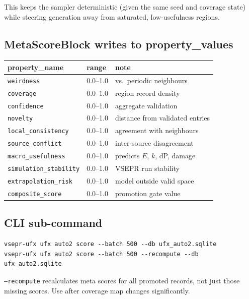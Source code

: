 \documentclass[11pt, a4paper]{article}
\begin{document}
This keeps the sampler deterministic (given the same seed and coverage state)
while steering generation away from saturated, low-usefulness regions.

\subsection{MetaScoreBlock writes to property\_values}

\begin{center}
\begin{tabular}{lll}
\toprule
\textbf{property\_name} & \textbf{range} & \textbf{note} \\
\midrule
\texttt{weirdness}              & 0.0--1.0 & vs.\ periodic neighbours \\
\texttt{coverage}               & 0.0--1.0 & region record density \\
\texttt{confidence}             & 0.0--1.0 & aggregate validation \\
\texttt{novelty}                & 0.0--1.0 & distance from validated entries \\
\texttt{local\_consistency}     & 0.0--1.0 & agreement with neighbours \\
\texttt{source\_conflict}       & 0.0--1.0 & inter-source disagreement \\
\texttt{macro\_usefulness}      & 0.0--1.0 & predicts $E$, $k$, dP, damage \\
\texttt{simulation\_stability}  & 0.0--1.0 & VSEPR run stability \\
\texttt{extrapolation\_risk}    & 0.0--1.0 & model outside valid space \\
\texttt{composite\_score}       & 0.0--1.0 & promotion gate value \\
\bottomrule
\end{tabular}
\end{center}

\subsection{CLI sub-command}

\begin{lstlisting}[language={}]
vsepr-ufx ufx auto2 score --batch 500 --db ufx_auto2.sqlite
vsepr-ufx ufx auto2 score --batch 500 --recompute --db ufx_auto2.sqlite
\end{lstlisting}

\texttt{--recompute} recalculates meta scores for all promoted records, not just
those missing scores.  Use after coverage map changes significantly.
\end{document}
